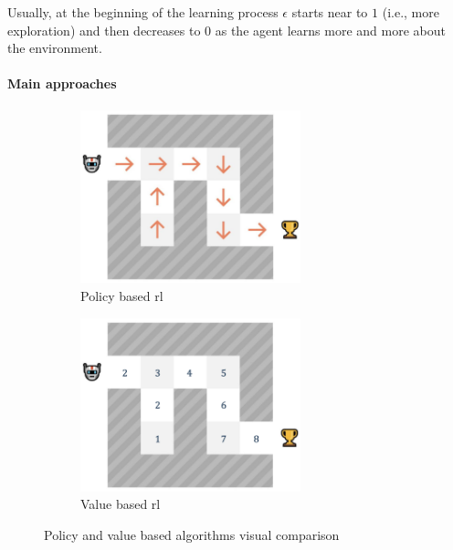 \documentclass[12pt,a4paper,openright,twoside]{book}
\begin{document}
    Usually, at the beginning of the learning process $\epsilon$ starts near to $1$ (i.e., more exploration) and then decreases
    to $0$ as the agent learns more and more about the environment. 

\paragraph{Main approaches} %

\begin{figure}[t]
    \begin{subfigure}[b]{0.49\textwidth}
        \centering
        \includegraphics[width=0.7\textwidth]{figures/policy-based-rl.png}
        \caption{Policy based rl}
        \label{fig:policy-based-rl}
    \end{subfigure}
    \begin{subfigure}[b]{0.49\textwidth}
        \centering
        \includegraphics[width=0.7\textwidth]{figures/value-based-rl.png}
        \caption{Value based rl}
        \label{fig:value-based-rl}
    \end{subfigure}
\caption{Policy and value based algorithms visual comparison}\vspace{-10pt}
\end{figure}
\end{document}
